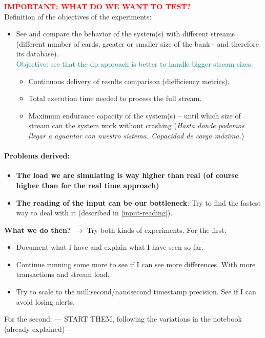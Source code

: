 \documentclass[12pt,a4paper]{article}
\begin{document}
\begin{tcolorbox}[colframe=red!75]
\textcolor{red}{\textbf{IMPORTANT: WHAT DO WE WANT TO TEST?\\}}
Definition of the objectives of the experiments:
\begin{itemize}
    \item See and compare the behavior of the system(s) with different streams (different number of cards, greater or smaller size of the bank - and therefore its database). \\
    \textcolor{teal}{Objective: see that the dp approach is better to handle bigger stream sizes.}
    \begin{itemize}
        \item Continuous delivery of results comparison (diefficiency metrics).
        \item Total execution time needed to process the full stream.
        \item Maximum endurance capacity of the system(s) -- until which size of stream can the system work without crashing (\textit{Hasta donde podemos llegar a aguantar con nuestro sistema. Capacidad de carga máxima.})
    \end{itemize}
\end{itemize}
\end{tcolorbox}

\paragraph{Problems derived:\\}
\begin{itemize}
    \item \textbf{The load we are simulating is way higher than real (of course higher than for the real time approach)}
    \item \textbf{The reading of the input can be our bottleneck}: Try to find the fastest way to deal with it (described in \ref{input-reading}).    
\end{itemize}

\textbf{What we do then?}
$\rightarrow$ Try both kinds of experiments. 
For the first:
\begin{itemize}
    \item Document what I have and explain what I have seen so far.
    \item Continue running some more to see if I can see more differences. With more transactions and stream load.
    \item Try to scale to the millisecond/nanosecond timestamp precision. See if I can avoid losing alerts.
\end{itemize}
For the second:
--- START THEM, following the variations in the notebook (already explained)---
\end{document}
